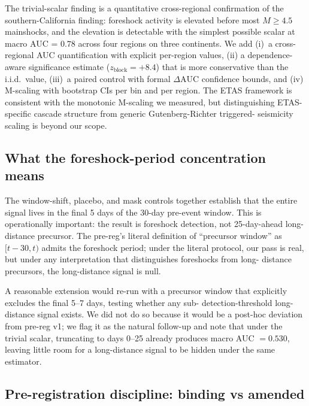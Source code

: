 \documentclass[11pt]{article}
\begin{document}
The trivial-scalar finding is a quantitative cross-regional
confirmation of the \citet{trugman2019} southern-California finding:
foreshock activity is elevated before most $M{\ge}4.5$ mainshocks, and
the elevation is detectable with the simplest possible scalar at macro
AUC = $0.78$ across four regions on three continents. We add (i)~a
cross-regional AUC quantification with explicit per-region values, (ii)
a dependence-aware significance estimate ($z_\mathrm{block} = +8.4$)
that is more conservative than the i.i.d.\ value, (iii)~a paired
control with formal $\Delta\mathrm{AUC}$ confidence bounds, and (iv)
M-scaling with bootstrap CIs per bin and per region. The
\citet{helmstetter2003a, helmstetter2003b} ETAS framework is consistent
with the monotonic M-scaling we measured, but distinguishing ETAS-
specific cascade structure from generic Gutenberg-Richter triggered-
seismicity scaling is beyond our scope.

\subsection{What the foreshock-period concentration means}

The window-shift, placebo, and mask controls together establish that
the entire signal lives in the final 5 days of the 30-day pre-event
window. This is operationally important: the result is foreshock
detection, not 25-day-ahead long-distance precursor. The pre-reg's
literal definition of ``precursor window'' as $[t-30, t)$ admits the
foreshock period; under the literal protocol, our pass is real, but
under any interpretation that distinguishes foreshocks from long-
distance precursors, the long-distance signal is null.

A reasonable extension would re-run with a precursor window that
explicitly excludes the final 5--7 days, testing whether any sub-
detection-threshold long-distance signal exists. We did not do so
because it would be a post-hoc deviation from pre-reg v1; we flag it
as the natural follow-up and note that under the trivial scalar,
truncating to days 0--25 already produces macro AUC $= 0.530$, leaving
little room for a long-distance signal to be hidden under the same
estimator.

\subsection{Pre-registration discipline: binding vs amended}
\label{sec:disc-prereg}
\end{document}
